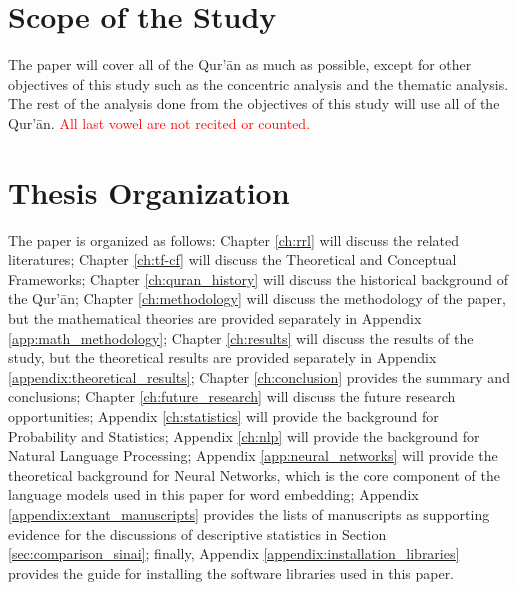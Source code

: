 \section{Scope of the Study}
The paper will cover all   of the Qur'\=an as much as possible, except for other objectives of this study such as the concentric analysis and the thematic analysis. The rest of the analysis done from the objectives of this study will use all   of the Qur'\=an. \textcolor{red}{All last vowel are not recited or counted.}
\section{Thesis Organization}
The paper is organized as follows: Chapter \ref{ch:rrl} will discuss the related literatures; Chapter \ref{ch:tf-cf} will discuss the Theoretical and Conceptual Frameworks; Chapter \ref{ch:quran_history} will discuss the historical background of the Qur'\=an; Chapter \ref{ch:methodology} will discuss the methodology of the paper, but the mathematical theories are provided separately in Appendix \ref{app:math_methodology}; Chapter \ref{ch:results} will discuss the results of the study, but the theoretical results are provided separately in Appendix \ref{appendix:theoretical_results}; Chapter \ref{ch:conclusion} provides the summary and conclusions; Chapter \ref{ch:future_research} will discuss the future research opportunities; Appendix \ref{ch:statistics} will provide the background for Probability and Statistics; Appendix \ref{ch:nlp} will provide the background for Natural Language Processing; Appendix \ref{app:neural_networks} will provide the theoretical background for Neural Networks, which is the core component of the language models used in this paper for word embedding; Appendix \ref{appendix:extant_manuscripts} provides the lists of manuscripts as supporting evidence for the discussions of descriptive statistics in Section \ref{sec:comparison_sinai}; finally, Appendix \ref{appendix:installation_libraries} provides the guide for installing the software libraries used in this paper.
